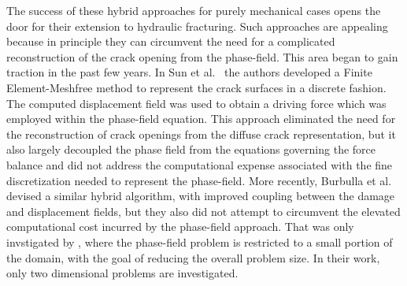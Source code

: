     The success of these hybrid approaches for purely mechanical cases opens the door for their extension to hydraulic fracturing.  Such approaches are appealing because in principle they can circumvent the need for a complicated reconstruction of the crack opening from the phase-field.  This area began to gain traction in the past few years. In Sun et al.\ \cite{sun2020hybrid} the authors developed a Finite Element-Meshfree method to represent the crack surfaces in a discrete fashion. The computed displacement field was used to obtain a driving force which was employed within the phase-field equation. This approach eliminated the need for the reconstruction of crack openings from the diffuse crack representation, but it also largely decoupled the phase field from the equations governing the force balance and did not address the computational expense associated with the fine discretization needed to represent the phase-field. More recently, Burbulla et al. \cite{burbulla2023modeling} devised a similar hybrid algorithm, with improved coupling between the damage and displacement fields, but they also did not attempt to circumvent the elevated computational cost incurred by the phase-field approach. That was only invstigated by \cite{zhang2022hybrid}, where the phase-field problem is restricted to a small portion of the domain, with the goal of reducing the overall problem size. In their work, only two dimensional problems are investigated.
        








